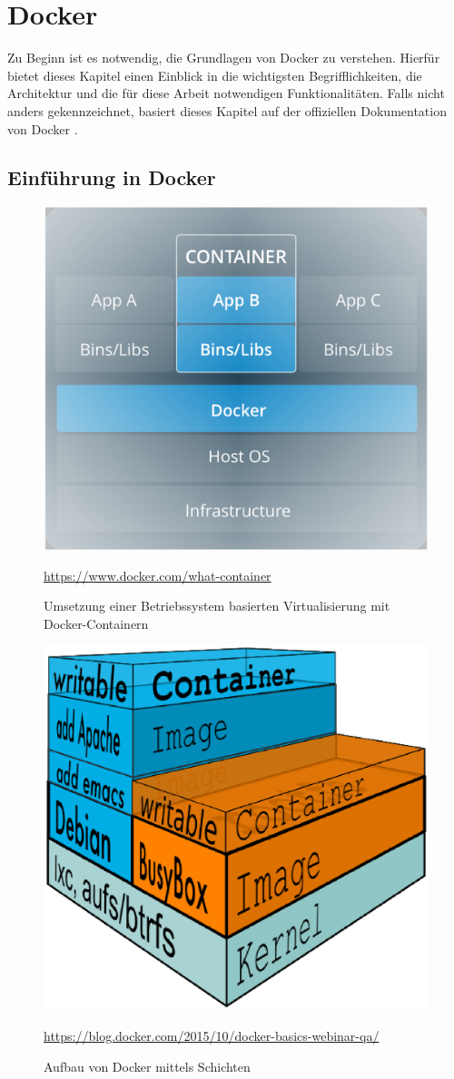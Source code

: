 \chapter{Docker}
\label{c:docker}

Zu Beginn ist es notwendig, die Grundlagen von Docker zu verstehen.
Hierfür bietet dieses Kapitel einen Einblick in die wichtigsten Begrifflichkeiten, die Architektur und die für diese Arbeit notwendigen Funktionalitäten.
Falls nicht anders gekennzeichnet, basiert dieses Kapitel auf der offiziellen Dokumentation von Docker \cite{Docker:online1}.

\section{Einführung in Docker}
\label{c:einführung}

\begin{figure}
	\centering
	\includegraphics[width=0.7\linewidth]{figures/Docker}
	\caption[Betriebssystem Virtualisierung mit Docker-Containern]{Umsetzung einer Betriebssystem basierten Virtualisierung mit Docker-Containern}
	\label{fig:docker}
	\tiny{\quelle\url{https://www.docker.com/what-container}}
\end{figure}

\begin{figure}
	\centering
	\includegraphics[width=0.7\linewidth]{figures/DockerLayer}
	\caption[Aufbau von Docker mittels Schichten]{Aufbau von Docker mittels Schichten}
	\label{fig:dockerlayer}
	\tiny{\quelle\url{https://blog.docker.com/2015/10/docker-basics-webinar-qa/}}
\end{figure}


